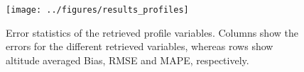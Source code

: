 \documentclass[a4paper,11pt,bibtotoc]{scrartcl}
\begin{document}
\begin{figure}[hbpt]
  \centering
  \texttt{[image: ../figures/results\_profiles]}
  \caption{
    Error statistics of the retrieved profile variables. Columns show the
    errors for the different retrieved variables, whereas rows show 
    altitude averaged Bias, RMSE and MAPE, respectively.
  }
  \label{fig:results_profiles}
\end{figure}

%
%
%
%
%
\end{document}
